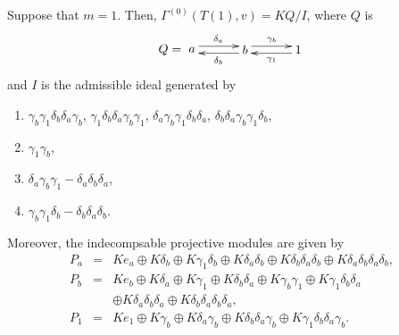 \documentclass[12pt]{amsart}
\numberwithin{equation}{thm}
\begin{document}
Suppose that $m=1$. Then, $\Gamma^{(0)}(T(1),v)=KQ/I$, where $Q$ is 
\[
Q=\begin{xy}
(0,0)*[o]+{a}="-1",(15,0)*[o]+{b}="0",(30,0)*[o]+{1}="1", 
\ar @<1mm> "0";"-1"^{\delta_{b}}
\ar @<1mm> "-1";"0"^{\delta_{a}}
\ar @<1mm> "0";"1"^{\gamma_{b}}
\ar @<1mm> "1";"0"^{\gamma_{1}}
\end{xy}
\]
and $I$ is the admissible ideal generated by
\begin{enumerate}
\item $\gamma_{b}\gamma_1\delta_{b}\delta_{a}\gamma_{b}$, 
$\gamma_1\delta_{b}\delta_{a}\gamma_{b}\gamma_1$, 
$\delta_{a}\gamma_{b}\gamma_1\delta_{b}\delta_{a}$, $\delta_{b}\delta_{a}\gamma_{b}\gamma_1\delta_{b}$,
\item $\gamma_1\gamma_{b}$,
\item $\delta_{a}\gamma_{b}\gamma_1-\delta_{a}\delta_{b}\delta_{a}$,
\item $\gamma_{b}\gamma_1\delta_{b}-\delta_{b}\delta_{a}\delta_{b}$.
\end{enumerate}
Moreover, the indecompsable projective modules are given by
\[\begin{array}{lcl}
P_a &=&Ke_a\oplus K\delta_b \oplus K\gamma_{1}\delta_b \oplus K\delta_a\delta_b \oplus K\delta_b\delta_a\delta_b \oplus K\delta_a\delta_b\delta_a\delta_b, \\
P_b &=& Ke_b \oplus K\delta_a \oplus K\gamma_{1} \oplus K\delta_b\delta_a 
\oplus K\gamma_b\gamma_{1} \oplus K\gamma_{1}\delta_b\delta_a \\
        & & \oplus K\delta_a\delta_b\delta_a \oplus K\delta_b\delta_a\delta_b\delta_a, \\
P_1  &=& Ke_1\oplus K\gamma_b \oplus K\delta_a\gamma_b \oplus K\delta_b\delta_a\gamma_b \oplus K\gamma_{1}\delta_b\delta_a\gamma_b.
\end{array} \]
\end{document}
